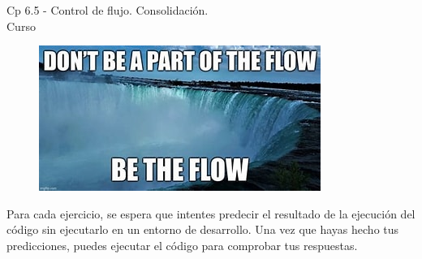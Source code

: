 \begin{center}
    \begin{large}
    Cp 6.5 - Control de flujo. Consolidación.\\
    Curso \academicyear\\
    \end{large}
    \begin{figure}[h]
    	\centering
    	\includegraphics[width=0.5\linewidth]{cp4.5/control_flow.jpg}
    \end{figure}
\end{center}

Para cada ejercicio, se espera que intentes predecir el resultado de la ejecución del código sin ejecutarlo en un entorno de desarrollo. Una vez que hayas hecho tus predicciones, puedes ejecutar el código para comprobar tus respuestas.

